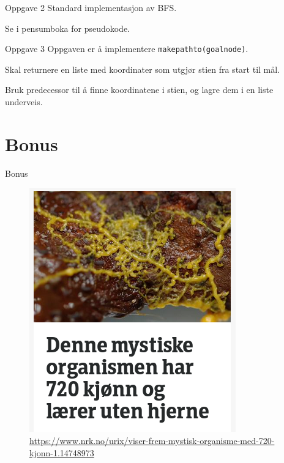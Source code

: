 \documentclass[14pt]{beamer}
\begin{document}
\begin{frame}{Oppgave 2}
    Standard implementasjon av BFS.

    \pause

    Se i pensumboka for pseudokode.
\end{frame}
\begin{frame}[fragile]{Oppgave 3}
    Oppgaven er å implementere \verb|makepathto(goalnode)|.

    \pause

    Skal returnere en liste med koordinater som utgjør stien fra start til mål.

    \pause

    Bruk predecessor til å finne koordinatene i stien, og lagre dem i en liste underveis.
\end{frame}

\section{Bonus}
\begin{frame}[fragile]{Bonus}
    \centering
    \begin{figure}
        \includegraphics[height=0.75\textheight]{images/slimsopp_nrk.png}
        \caption{\tiny \url{https://www.nrk.no/urix/viser-frem-mystisk-organisme-med-720-kjonn-1.14748973}}
    \end{figure}
\end{frame}
\end{document}
